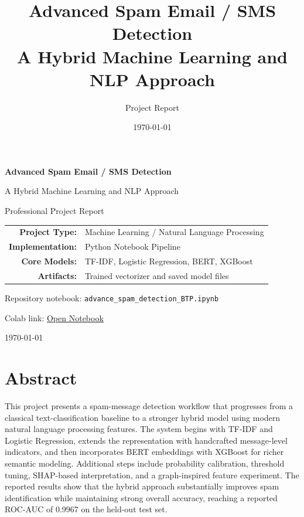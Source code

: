 \documentclass[12pt,a4paper]{article}
\title{\textbf{Advanced Spam Email / SMS Detection}\\[0.5em]
\large A Hybrid Machine Learning and NLP Approach}
\author{Project Report}
\date{\today}
\begin{document}
\begin{titlepage}
    \centering
    \vspace*{2.5cm}

    {\Huge \textbf{Advanced Spam Email / SMS Detection}\par}
    \vspace{0.6cm}
    {\Large A Hybrid Machine Learning and NLP Approach\par}
    \vspace{1.8cm}

    {\large Professional Project Report\par}
    \vspace{1.2cm}

    \begin{tabular}{rl}
        \textbf{Project Type:} & Machine Learning / Natural Language Processing \\
        \textbf{Implementation:} & Python Notebook Pipeline \\
        \textbf{Core Models:} & TF-IDF, Logistic Regression, BERT, XGBoost \\
        \textbf{Artifacts:} & Trained vectorizer and saved model files \\
    \end{tabular}

    \vfill

    {\large
    Repository notebook: \texttt{advance\_spam\_detection\_BTP.ipynb}\par
    }
    \vspace{0.5cm}
    {\large
    Colab link: \href{https://colab.research.google.com/drive/1PKJwAwZ50F5eHQ_Dw-dc7CqMyFmJ_XWa?usp=sharing}{Open Notebook}
    \par}

    \vfill

    {\large \today\par}
\end{titlepage}

\tableofcontents
\newpage

\section{Abstract}
This project presents a spam-message detection workflow that progresses from a classical text-classification baseline to a stronger hybrid model using modern natural language processing features. The system begins with TF-IDF and Logistic Regression, extends the representation with handcrafted message-level indicators, and then incorporates BERT embeddings with XGBoost for richer semantic modeling. Additional steps include probability calibration, threshold tuning, SHAP-based interpretation, and a graph-inspired feature experiment. The reported results show that the hybrid approach substantially improves spam identification while maintaining strong overall accuracy, reaching a reported ROC-AUC of 0.9967 on the held-out test set.
\end{document}
